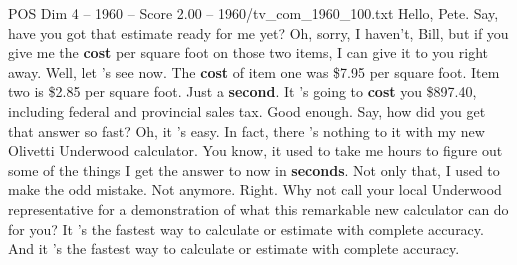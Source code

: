\begin{textsample}{POS Dim 4 – 1960 – Score 2.00 – 1960/tv\_com\_1960\_100.txt}  \label{ex:f4_pos_009}
Hello, Pete.
Say, have you got that estimate ready for me yet?
Oh, sorry, I haven't, Bill, but if you give me the \textbf{cost} per square foot on those two items, I can give it to you right away.
Well, let 's see now.
The \textbf{cost} of item one was \$7.95 per square foot.
Item two is \$2.85 per square foot.
Just a \textbf{second}.
It 's going to \textbf{cost} you \$897.40, including federal and provincial sales tax.
Good enough.
Say, how did you get that answer so fast?
Oh, it 's easy.
In fact, there 's nothing to it with my new Olivetti Underwood calculator.
You know, it used to take me hours to figure out some of the things I get the answer to now in \textbf{seconds}.
Not only that, I used to make the odd mistake.
Not anymore.
Right.
Why not call your local Underwood representative for a demonstration of what this remarkable new calculator can do for you?
It 's the fastest way to calculate or estimate with complete accuracy.
And it 's the fastest way to calculate or estimate with complete accuracy.

\end{textsample}
